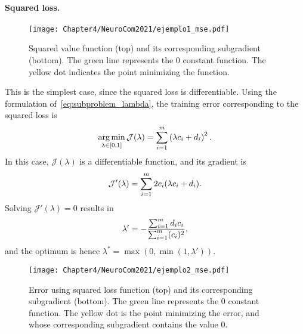 \paragraph*{Squared loss.\\}
\begin{figure}[t!]
    \centering
    \texttt{[image: Chapter4/NeuroCom2021/ejemplo1\_mse.pdf]}
    \caption{Squared value function (top) and its corresponding subgradient (bottom). The green line represents the $0$ constant function. The yellow dot indicates the point minimizing the function.}
    \label{fig:sq_loss}
\end{figure}
This is the simplest case, since the squared loss is differentiable.
Using the formulation of~\eqref{eq:subproblem_lambda}, the training error corresponding to the squared loss is
\begin{equation}
    \label{eq:opt_sq}
    \argmin_{\lambda \in [0, 1]} \mathcal{J}(\lambda) = \sum_{i=1}^{\npertask} \left({\lambda c_i + d_i}\right)^2 .
\end{equation}
In this case, $\mathcal{J}(\lambda)$ is a differentiable function, and its gradient is 
\begin{equation}
    \nonumber
    \mathcal{J}'(\lambda) = \sum_{i=1}^m 2 c_i (\lambda c_i + d_i) .
\end{equation}
Solving $\mathcal{J}'(\lambda)= 0$ results in
%
\begin{equation*}
\lambda' =  -\frac{\sum_{i=1}^{m} d_i c_i }{\sum_{i=1}^{m} (c_i)^2 } ,
\end{equation*}
and the optimum is hence $\lambda^* = \max(0, \min(1, \lambda'))$.
\begin{figure}[t!]
    \centering
    \texttt{[image: Chapter4/NeuroCom2021/ejemplo2\_mse.pdf]}
    \caption{Error using squared loss function (top) and its corresponding subgradient (bottom). The green line represents the $0$ constant function. The yellow dot is the point minimizing the error, and whose corresponding subgradient contains the value $0$.}
    \label{fig:sq_error}
\end{figure}


